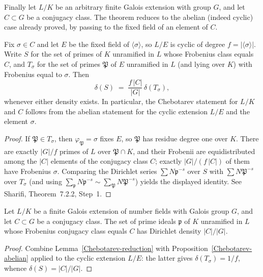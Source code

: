 Finally let $L/K$ be an arbitrary finite Galois extension with group $G$, and let $C\subset G$
be a conjugacy class.  The theorem reduces to the abelian (indeed cyclic) case already proved,
by passing to the fixed field of an element of $C$.
\begin{lemma}\label{Chebotarev-reduction}
Fix $\sigma\in C$ and let $E$ be the fixed field of $\langle\sigma\rangle$, so $L/E$ is cyclic of
degree $f = |\langle\sigma\rangle|$.  Write $S$ for the set of primes of $K$ unramified in $L$
whose Frobenius class equals $C$, and $T_\sigma$ for the set of primes $\mathfrak{P}$ of $E$
unramified in $L$ (and lying over $K$) with Frobenius equal to $\sigma$.  Then
\[
\delta(S) \;=\; \frac{f\,|C|}{|G|}\,\delta(T_\sigma),
\]
whenever either density exists.  In particular, the Chebotarev statement for $L/K$ and $C$
follows from the abelian statement for the cyclic extension $L/E$ and the element $\sigma$.
\end{lemma}
\begin{proof}
If $\mathfrak{P}\in T_\sigma$, then $\varphi_{\mathfrak{P}}=\sigma$ fixes $E$, so $\mathfrak{P}$ has
residue degree one over $K$.  There are exactly $|G|/f$ primes of $L$ over $\mathfrak{P}\cap K$,
and their Frobenii are equidistributed among the $|C|$ elements of the conjugacy class $C$;
exactly $|G|/(f\,|C|)$ of them have Frobenius $\sigma$.  Comparing the Dirichlet series
$\sum N\mathfrak{p}^{-s}$ over $S$ with $\sum N\mathfrak{P}^{-s}$ over $T_\sigma$ (and using
$\sum_{\mathfrak{p}} N\mathfrak{p}^{-s} \sim \sum_{\mathfrak{P}} N\mathfrak{P}^{-s}$) yields the
displayed identity.  See Sharifi, Theorem~7.2.2, Step~1.
\end{proof}
\begin{theorem}\label{Chebotarev-general}
Let $L/K$ be a finite Galois extension of number fields with Galois group $G$, and let
$C\subset G$ be a conjugacy class.  The set of prime ideals $\mathfrak{p}$ of $K$ unramified in
$L$ whose Frobenius conjugacy class equals $C$ has Dirichlet density $|C|/|G|$.
\end{theorem}
\begin{proof}
Combine Lemma~\ref{Chebotarev-reduction} with Proposition~\ref{Chebotarev-abelian} applied to
the cyclic extension $L/E$: the latter gives $\delta(T_\sigma) = 1/f$, whence
$\delta(S) = |C|/|G|$.
\end{proof}
